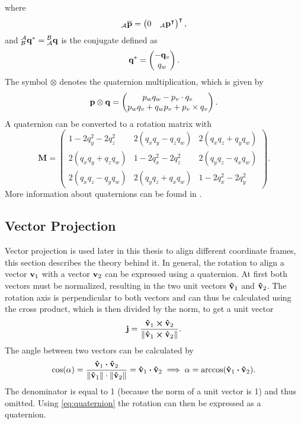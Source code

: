 where
\begin{equation}
	{}_\mathcal{A}\overline{\vb{p}} = \begin{pmatrix}
		0 & {}_\mathcal{A}\vb{p}^\intercal
	\end{pmatrix}^\intercal,
\end{equation}
and $\qtf{a}{b}^* = \qtf{b}{a}$ is the conjugate defined as
\begin{equation}
	\qtf{}{}^* = \begin{pmatrix}
		-\vb{q}_v \\
		q_w
	\end{pmatrix}.
\end{equation}
The symbol $\otimes$ denotes the quaternion multiplication, which is given by
\begin{equation}
	\vb{p} \otimes \vb{q} =
	\begin{pmatrix}
		p_{w} q_{w}-p_v \cdot q_v \\
		p_{w} q_v+q_{w} p_v+p_v \times q_v
	\end{pmatrix}.
\end{equation}
A quaternion can be converted to a rotation matrix with
\begin{equation}
	\label{eq:q_to_M}
	\mathbf{M} =
	\begin{pmatrix}
		1 - 2q_y^2-2 q_z^2   & 2(q_x q_y- q_z q_w) & 2(q_x q_z + q_y q_w) \\
		2(q_x q_y + q_z q_w) & 1-2 q_x^2-2 q_z^2   & 2(q_y q_z -q_x q_w)  \\
		2(q_x q_z-q_y q_w)   & 2(q_y q_z+ q_x q_w) & 1 - 2 q_x^2- 2 q_y^2
	\end{pmatrix}.
\end{equation}
More information about quaternions can be found in \cite{Kok2017,Trawny2005}.\\

\subsection{Vector Projection}
\label{subsec:vector_projection}
Vector projection is used later in this thesis to align different coordinate frames, this section describes the theory behind it.
In general, the rotation to align a vector $\vb{v}_1$ with a vector $\vb{v}_2$ can be expressed using a quaternion.
At first both vectors must be normalized, resulting in the two unit vectors $\vu{v}_1$ and $\vu{v}_2$.
The rotation axis is perpendicular to both vectors and can thus be calculated using the cross product, which is then divided by the norm, to get a unit vector
\begin{equation}
	\vb{j} = \frac{\vu{v}_1 \cp \vu{v}_2}{\norm{\vu{v}_1 \cp \vu{v}_2}}.
\end{equation}
The angle between two vectors can be calculated by
\begin{equation}
	\cos(\alpha) = \frac{\vu{v}_1 \vdot \vu{v}_2}{\norm{\vu{v}_1} \cdot \norm{\vu{v}_2}}
	= \vu{v}_1 \vdot \vu{v}_2 \implies
	\alpha = \arccos(\vu{v}_1 \vdot \vu{v}_2).
\end{equation}
The denominator is equal to 1 (because the norm of a unit vector is 1) and thus omitted.
Using \cref{eq:quaternion} the rotation can then be expressed as a quaternion.



